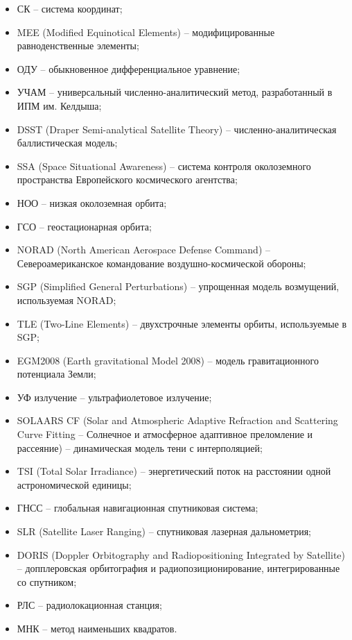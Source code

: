 \begin{itemize}
    \item СК -- система координат;
    \item MEE (Modified Equinotical Elements) -- модифицированные равноденственные элементы;
    \item ОДУ -- обыкновенное дифференциальное уравнение;
    \item УЧАМ -- универсальный численно-аналитический метод,
    разработанный в ИПМ им. Келдыша;
    \item DSST (Draper Semi-analytical Satellite Theory) -- численно-аналитическая баллистическая модель;
    \item SSA (Space Situational Awareness) -- система контроля околоземного пространства Европейского космического агентства;
    \item НОО -- низкая околоземная орбита;
    \item ГСО -- геостационарная орбита;
    \item NORAD (North American Aerospace Defense Command) -- Североамериканское командование воздушно-космической обороны;
    \item SGP (Simplified General Perturbations) -- упрощенная модель возмущений, используемая NORAD;
    \item TLE (Two-Line Elements) -- двухстрочные элементы орбиты, используемые в SGP;
    \item EGM2008 (Earth gravitational Model 2008) -- модель гравитационного потенциала Земли;
    \item УФ излучение -- ультрафиолетовое излучение;
    \item SOLAARS CF (Solar and Atmospheric Adaptive Refraction and Scattering Curve Fitting
    -- Солнечное и атмосферное адаптивное преломление и рассеяние) -- динамическая модель тени с интерполяцией;
    \item TSI (Total Solar Irradiance) -- энергетический поток на расстоянии одной астрономической единицы;
    \item ГНСС -- глобальная навигационная спутниковая система;
    \item SLR (Satellite Laser Ranging) -- спутниковая лазерная дальнометрия;
    \item DORIS (Doppler Orbitography and Radiopositioning Integrated by Satellite) -- допплеровская орбитография и радиопозиционирование, интегрированные со спутником;
    \item РЛС -- радиолокационная станция;
    \item МНК -- метод наименьших квадратов.
\end{itemize}

\newpage
